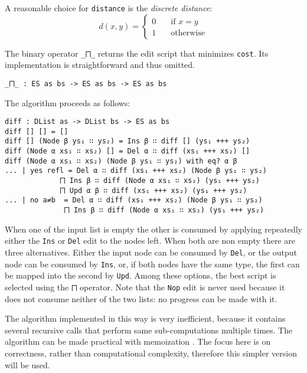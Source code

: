 \documentclass[../Thesis.tex]{subfiles}
\begin{document}
	A reasonable choice for \texttt{distance} is the \emph{discrete distance}:
	\[ d(x, y) = 
		\begin{cases} 
			0 \quad &\mbox{if } x = y \\
			1 \quad &\mbox {otherwise}		
		\end{cases} \]
	
	The binary operator \texttt{\_⨅\_} returns the edit script that minimizes 	
	\texttt{cost}. Its implementation is straightforward and thus omitted.

\begin{verbatim}
_⨅_ : ES as bs -> ES as bs -> ES as bs
\end{verbatim}

	The algorithm proceeds as follows:

\begin{verbatim}
diff : DList as -> DList bs -> ES as bs
diff [] [] = []
diff [] (Node β ys₁ ∷ ys₂) = Ins β ∷ diff [] (ys₁ +++ ys₂)
diff (Node α xs₁ ∷ xs₂) [] = Del α ∷ diff (xs₁ +++ xs₂) []
diff (Node α xs₁ ∷ xs₂) (Node β ys₁ ∷ ys₂) with eq? α β
... | yes refl = Del α ∷ diff (xs₁ +++ xs₂) (Node β ys₁ ∷ ys₂) 
             ⨅ Ins β ∷ diff (Node α xs₁ ∷ xs₂) (ys₁ +++ ys₂) 
             ⨅ Upd α β ∷ diff (xs₁ +++ xs₂) (ys₁ +++ ys₂)
... | no a≠b  = Del α ∷ diff (xs₁ +++ xs₂) (Node β ys₁ ∷ ys₂) 
              ⨅ Ins β ∷ diff (Node α xs₁ ∷ xs₂) (ys₁ +++ ys₂)
\end{verbatim}
	
	When one of the input list is empty the other is consumed 
	by applying repeatedly either the \texttt{Ins} or \texttt{Del} edit
	to the nodes left. When both are non empty there are three
	alternatives. Either the input node can be consumed by \texttt{Del},
	or the output node can be consumed by \texttt{Ins}, or, if
	both nodes have the same type, the first can be mapped into
	the second by \texttt{Upd}. Among these options, the best 
	script is selected using the \texttt{⨅} operator.
	Note that the \texttt{Nop} edit is never used because it does
	not consume neither of the two lists: no progress can be made with it.

	The algorithm implemented in this way is very inefficient,
	because it contains several recursive calls that perform same 
	sub-computations multiple times. 
	The algorithm can be made practical with memoization \cite{Lemp09}.
	The focus here is on correctness, rather than computational complexity, 
	therefore this simpler version will be used.
	
\end{document}
